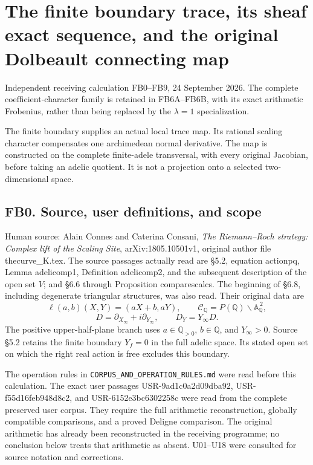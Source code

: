 \section{The finite boundary trace, its sheaf exact sequence, and the
original Dolbeault connecting
map}\label{the-finite-boundary-trace-its-sheaf-exact-sequence-and-the-original-dolbeault-connecting-map}

Independent receiving calculation FB0--FB9, 24 September 2026. The
complete coefficient-character family is retained in FB6A--FB6B, with
its exact arithmetic Frobenius, rather than being replaced by the
\(\lambda=1\) specialization.

The finite boundary supplies an actual local trace map. Its rational
scaling character compensates one archimedean normal derivative. The map
is constructed on the complete finite-adele transversal, with every
original Jacobian, before taking an adelic quotient. It is not a
projection onto a selected two-dimensional space.

\subsection{FB0. Source, user definitions, and
scope}\label{fb0.-source-user-definitions-and-scope}

Human source: Alain Connes and Caterina Consani, \emph{The Riemann--Roch
strategy: Complex lift of the Scaling Site}, arXiv:1805.10501v1,
original author file thecurve\_K.tex. The source passages actually read
are §5.2, equation actionpq, Lemma adelicomp1, Definition adelicomp2,
and the subsequent description of the open set \(V\); and §6.6 through
Proposition comparescalcs. The beginning of §6.8, including degenerate
triangular structures, was also read. Their original data are \[
\ell(a,b)(X,Y)=(aX+b,aY),\qquad
\mathcal C_{\mathbb Q}=P(\mathbb Q)\backslash\mathbb A_{\mathbb Q}^{\,2},
\] \[
D=\partial_{X_\infty}+i\partial_{Y_\infty},\qquad
D_Y=Y_\infty D.
\tag{FB0.1}
\] The positive upper-half-plane branch uses \(a\in\mathbb Q_{>0}\),
\(b\in\mathbb Q\), and \(Y_\infty>0\). Source §5.2 retains the finite
boundary \(Y_f=0\) in the full adelic space. Its stated open set on
which the right real action is free excludes this boundary.

The operation rules in \nolinkurl{CORPUS_AND_OPERATION_RULES.md} were read before
this calculation. The exact user passages USR-9ad1c0a2d09dba92,
USR-f55d16feb948d8c2, and USR-6152e3bc6302258c were read from the
complete preserved user corpus. They require the full arithmetic
reconstruction, globally compatible comparisons, and a proved Deligne
comparison. The original arithmetic has already been reconstructed in
the receiving programme; no conclusion below treats that arithmetic as
absent. U01--U18 were consulted for source notation and corrections.

